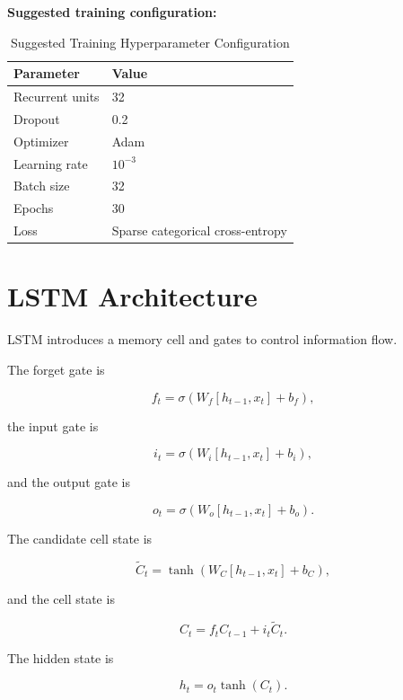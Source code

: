 \documentclass[10pt]{article}
\begin{document}
\textbf{Suggested training configuration:}

\begin{table}[H]
\centering
\begin{tabular}{|l|l|}
\hline
Parameter & Value\\
\hline
Recurrent units & 32\\
Dropout & 0.2\\
Optimizer & Adam\\
Learning rate & $10^{-3}$\\
Batch size & 32\\
Epochs & 30\\
Loss & Sparse categorical cross-entropy\\
\hline
\end{tabular}
\caption{Suggested Training Hyperparameter Configuration}
\label{tab:training_config}
\end{table}

\section{LSTM Architecture}

LSTM introduces a memory cell and gates to control information flow.

The forget gate is

\[
f_t=\sigma(W_f[h_{t-1},x_t]+b_f),
\]

the input gate is

\[
i_t=\sigma(W_i[h_{t-1},x_t]+b_i),
\]

and the output gate is

\[
o_t=\sigma(W_o[h_{t-1},x_t]+b_o).
\]

The candidate cell state is

\[
\tilde{C}_t=
\tanh(W_C[h_{t-1},x_t]+b_C),
\]

and the cell state is

\[
C_t=f_tC_{t-1}+i_t\tilde{C}_t.
\]

The hidden state is

\[
h_t=o_t\tanh(C_t).
\]

\begin{center}
\end{center}
\end{document}
